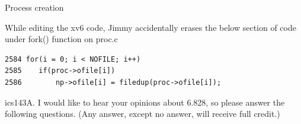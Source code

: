 \documentclass[11pt]{exam}
\begin{document}
\begin{questions}
\newpage
\addpoints
\question Process creation

While editing the xv6 code, Jimmy accidentally erases the below section of
code under fork() function on proc.c
\begin{verbatim}
2584 for(i = 0; i < NOFILE; i++)
2585    if(proc->ofile[i])
2586        np->ofile[i] = filedup(proc->ofile[i]);
\end{verbatim}


\newpage
\addpoints

\question ics143A. I would like to hear your opinions about 6.828, so please answer the following questions. (Any answer, except
no answer, will receive full credit.)


\end{questions}
\end{document}
